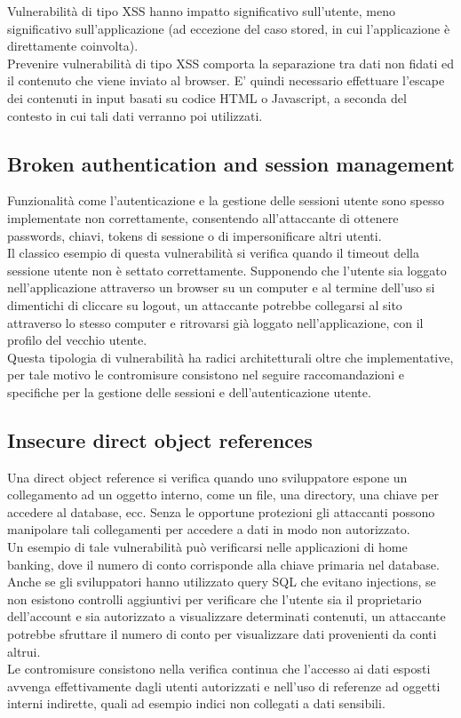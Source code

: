Vulnerabilità di tipo XSS hanno impatto significativo sull'utente, meno significativo sull'applicazione (ad eccezione del caso stored, in cui l'applicazione è direttamente coinvolta).\\
Prevenire vulnerabilità di tipo XSS comporta la separazione tra dati non fidati ed il contenuto che viene inviato al browser. E' quindi necessario effettuare l'escape dei contenuti in input basati su codice HTML o Javascript, a seconda del contesto in cui tali dati verranno poi utilizzati.

\subsection{Broken authentication and session management}
Funzionalità come l'autenticazione e la gestione delle sessioni utente sono spesso implementate non correttamente, consentendo all'attaccante di ottenere passwords, chiavi, tokens di sessione o di impersonificare altri utenti.\\
Il classico esempio di questa vulnerabilità si verifica quando il timeout della sessione utente non è settato correttamente. Supponendo che l'utente sia loggato nell'applicazione attraverso un browser su un computer e al termine dell'uso si dimentichi di cliccare su logout, un attaccante potrebbe collegarsi al sito attraverso lo stesso computer e ritrovarsi già loggato nell'applicazione, con il profilo del vecchio utente. \\
Questa tipologia di vulnerabilità ha radici architetturali oltre che implementative, per tale motivo le contromisure consistono nel seguire raccomandazioni e specifiche per la gestione delle sessioni e dell'autenticazione utente.

\subsection{Insecure direct object references}
Una direct object reference si verifica quando uno sviluppatore espone un collegamento ad un oggetto interno, come un file, una directory, una chiave per accedere al database, ecc. Senza le opportune protezioni gli attaccanti possono manipolare tali collegamenti per accedere a dati in modo non autorizzato.\\
Un esempio di tale vulnerabilità può verificarsi nelle applicazioni di home banking, dove il numero di conto corrisponde alla chiave primaria nel database. Anche se gli sviluppatori hanno utilizzato query SQL che evitano injections, se non esistono controlli aggiuntivi per verificare che l'utente sia il proprietario dell'account e sia autorizzato a visualizzare determinati contenuti, un attaccante potrebbe sfruttare il numero di conto per visualizzare dati provenienti da conti altrui.\\
Le contromisure consistono nella verifica continua che l'accesso ai dati esposti avvenga effettivamente dagli utenti autorizzati e nell'uso di referenze ad oggetti interni indirette, quali ad esempio indici non collegati a dati sensibili. 

